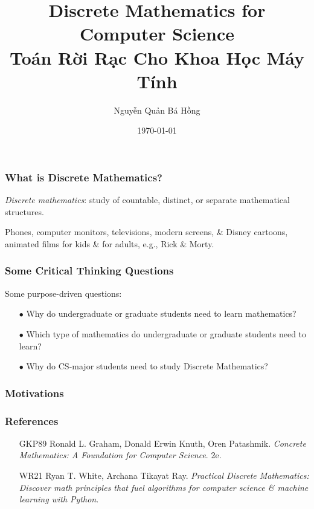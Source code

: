 \documentclass{beamer}
\title{Discrete Mathematics for Computer Science\\Toán Rời Rạc Cho Khoa Học Máy Tính}
\author{Nguyễn Quản Bá Hồng}
\institute{Presented at University of Management \& Technology of HCMC (UMT)}
\date{\today}
\begin{document}
\frame{\titlepage}

\begin{frame}
	\frametitle{What is Discrete Mathematics?}
	
	\begin{definition}
		\emph{Discrete mathematics}: study of countable, distinct, or separate mathematical structures.
	\end{definition}
	
	\begin{example}[Pixel]
		Phones, computer monitors, televisions, modern screens, \& Disney cartoons, animated films for kids \& for adults, e.g., Rick \& Morty.
	\end{example}
	
\end{frame}

\begin{frame}
	\frametitle{Some Critical Thinking Questions}
	Some purpose-driven questions:
	\begin{itemize}
		\item[$\bullet$] Why do undergraduate or graduate students need to learn mathematics?
		\item[$\bullet$] Which type of mathematics do undergraduate or graduate students need to learn?
		\item[$\bullet$] Why do CS-major students need to study Discrete Mathematics?
	\end{itemize}
\end{frame}

\begin{frame}
	\frametitle{Motivations}
	
	
\end{frame}

\begin{frame}
	\frametitle{References}
	\begin{itemize}
		\item[GKP89] {\sc Ronald L. Graham, Donald Erwin Knuth, Oren Patashmik}. {\it Concrete Mathematics: A Foundation for Computer Science}. 2e.
		
		\item[WR21] {\sc Ryan T. White, Archana Tikayat Ray}. {\it Practical Discrete Mathematics: Discover math principles that fuel algorithms for computer science \& machine learning with Python}.		
	\end{itemize}
	
\end{frame}
	
\end{document}
